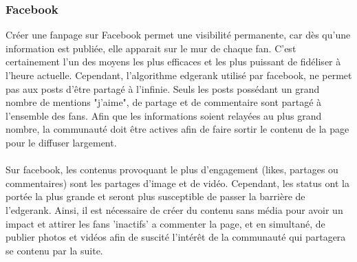 \subsubsection{Facebook}
Créer une fanpage sur Facebook permet une visibilité permanente, car dès qu'une information est publiée, elle apparait sur le mur de chaque fan. C'est certainement l'un des moyens les plus efficaces et les plus puissant de fidéliser à l'heure actuelle. Cependant, l'algorithme edgerank utilisé par facebook, ne permet pas aux posts d'être partagé à l'infinie. Seuls les posts possédant un grand nombre de mentions "j'aime", de partage et de commentaire sont partagé à l'ensemble des fans. Afin que les informations soient relayées au plus grand nombre, la communauté doit être actives afin de faire sortir le contenu de la page pour le diffuser largement.
\paragraph{}
Sur facebook, les contenus provoquant le plus d'engagement (likes, partages ou commentaires) sont les partages d'image et de vidéo. Cependant, les status ont la portée la plus grande et seront plus susceptible de passer la barrière de l'edgerank. Ainsi, il est nécessaire de créer du contenu sans média pour avoir un impact et attirer les fans 'inactifs' a commenter la page, et en simultané, de publier photos et vidéos afin de suscité l'intérêt de la communauté qui partagera se contenu par la suite.